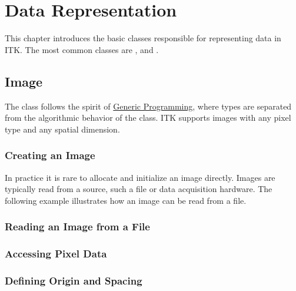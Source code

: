 
\chapter{Data Representation}
\label{sec:DataRepresentation}

This chapter introduces the basic classes responsible
for representing data in ITK. The most common classes are
,  and .

\section{Image}
\label{sec:ImageSection}

The  class follows the spirit of
\href{http://www.boost.org/more/generic_programming.html}{Generic Programming},
where types are separated from the algorithmic behavior of the class.
ITK supports images with any pixel type and any spatial dimension.

\subsection{Creating an Image}\label{sec:CreatingAnImageSection}



In practice it is rare to allocate and initialize an image directly.
Images are typically read from a source, such a file or data acquisition
hardware. The following example illustrates how an image can be read from
a file.


\subsection{Reading an Image from a File}
\label{sec:ReadingImageFromFile}




\subsection{Accessing Pixel Data}
\label{sec:AccessingImagePixelData}




\subsection{Defining Origin and Spacing}
\label{sec:DefiningImageOriginAndSpacing}





